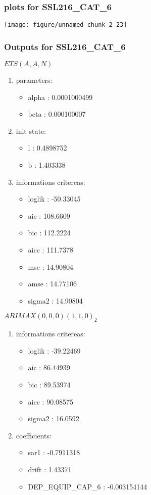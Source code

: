 \documentclass[10pt,a4paper]{article}\usepackage[]{graphicx}\usepackage[]{color}
\makeatletter
\def\maxwidth{ %
  \ifdim\Gin@nat@width>\linewidth
    \linewidth
  \else
    \Gin@nat@width
  \fi
}
\newcommand{\AaA}{\_}
\makeatother
\begin{document}
\subsubsection{plots for SSL216\AaA CAT\AaA 6}

\texttt{[image: figure/unnamed-chunk-2-23]} 

\newpage
\subsubsection{Outputs for SSL216\AaA CAT\AaA 6}
\begin{multicols}{2}


$ ETS(A,A,N) $
\begin{enumerate}
\item parameters:
\begin{itemize}
\item  alpha :  0.0001000499 
\item  beta :  0.000100007 
\end{itemize}
\item init state:
\begin{itemize}
\item  l :  0.4898752 
\item  b :  1.403338 
\end{itemize}
\item informations critereas:
\begin{itemize}
\item  loglik :  -50.33045 
\item  aic :  108.6609 
\item  bic :  112.2224 
\item  aicc :  111.7378 
\item  mse :  14.90804 
\item  amse :  14.77106 
\item  sigma2 :  14.90804 
\end{itemize}
\end{enumerate}

\columnbreak


 $ARIMAX(0,0,0)(1,1,0)_{2}$ 
\begin{enumerate}
\item informations critereas:
\begin{itemize}
\item  loglik :  -39.22469 
\item  aic :  86.44939 
\item  bic :  89.53974 
\item  aicc :  90.08575 
\item  sigma2 :  16.0592 
\end{itemize}

\item coefficients:
\begin{itemize}
\item  sar1 :  -0.7911318 
\item  drift :  1.43371 
\item  DEP\AaA EQUIP\AaA CAP\AaA 6 :  -0.003154144 
\end{itemize}
\end{enumerate}
\end{multicols}
\end{document}
